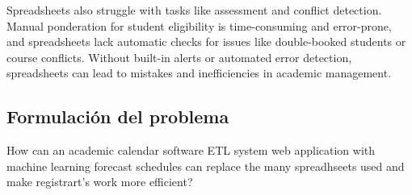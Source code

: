 Spreadsheets also struggle with tasks like assessment and conflict detection. Manual ponderation for student eligibility is time-consuming and error-prone, and spreadsheets lack automatic checks for issues like double-booked students or course conflicts. Without built-in alerts or automated error detection, spreadsheets can lead to mistakes and inefficiencies in academic management.


\subsection{Formulación del problema}
How can an academic calendar software ETL system web application with machine learning forecast schedules can replace the many spreadhseets used and make registrart's work more efficient?

